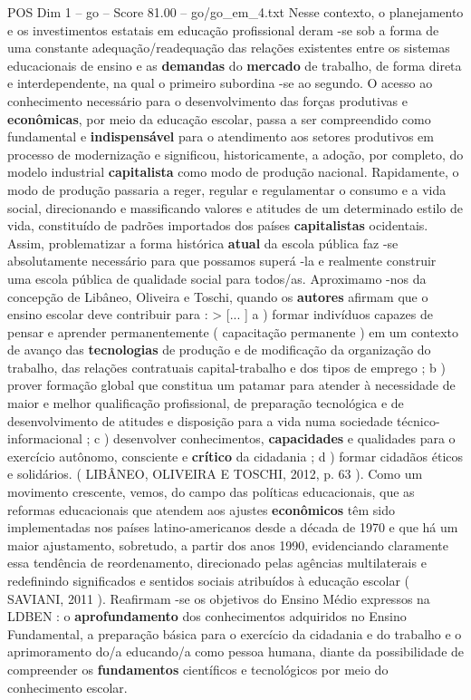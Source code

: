 \begin{textsample}{POS Dim 1 – go – Score 81.00 – go/go\_em\_4.txt}
Nesse contexto, o planejamento e os investimentos estatais em educação profissional deram -se sob a forma de uma constante adequação/readequação das relações existentes entre os sistemas educacionais de ensino e as \textbf{demandas} do \textbf{mercado} de trabalho, de forma direta e interdependente, na qual o primeiro subordina -se ao segundo.
O acesso ao conhecimento necessário para o desenvolvimento das forças produtivas e \textbf{econômicas}, por meio da educação escolar, passa a ser compreendido como fundamental e \textbf{indispensável} para o atendimento aos setores produtivos em processo de modernização e significou, historicamente, a adoção, por completo, do modelo industrial \textbf{capitalista} como modo de produção nacional.
Rapidamente, o modo de produção passaria a reger, regular e regulamentar o consumo e a vida social, direcionando e massificando valores e atitudes de um determinado estilo de vida, constituído de padrões importados dos países \textbf{capitalistas} ocidentais.
Assim, problematizar a forma histórica \textbf{atual} da escola pública faz -se absolutamente necessário para que possamos superá -la e realmente construir uma escola pública de qualidade social para todos/as.
Aproximamo -nos da concepção de Libâneo, Oliveira e Toschi, quando os \textbf{autores} afirmam que o ensino escolar deve contribuir para : > [... ] a ) formar indivíduos capazes de pensar e aprender permanentemente ( capacitação permanente ) em um contexto de avanço das \textbf{tecnologias} de produção e de modificação da organização do trabalho, das relações contratuais capital-trabalho e dos tipos de emprego ; b ) prover formação global que constitua um patamar para atender à necessidade de maior e melhor qualificação profissional, de preparação tecnológica e de desenvolvimento de atitudes e disposição para a vida numa sociedade técnico-informacional ; c ) desenvolver conhecimentos, \textbf{capacidades} e qualidades para o exercício autônomo, consciente e \textbf{crítico} da cidadania ; d ) formar cidadãos éticos e solidários. ( LIBÂNEO, OLIVEIRA E TOSCHI, 2012, p. 63 ).
Como um movimento crescente, vemos, do campo das políticas educacionais, que as reformas educacionais que atendem aos ajustes \textbf{econômicos} têm sido implementadas nos países latino-americanos desde a década de 1970 e que há um maior ajustamento, sobretudo, a partir dos anos 1990, evidenciando claramente essa tendência de reordenamento, direcionado pelas agências multilaterais e redefinindo significados e sentidos sociais atribuídos à educação escolar ( SAVIANI, 2011 ).
Reafirmam -se os objetivos do Ensino Médio expressos na LDBEN : o \textbf{aprofundamento} dos conhecimentos adquiridos no Ensino Fundamental, a preparação básica para o exercício da cidadania e do trabalho e o aprimoramento do/a educando/a como pessoa humana, diante da possibilidade de compreender os \textbf{fundamentos} científicos e tecnológicos por meio do conhecimento escolar.

\end{textsample}
